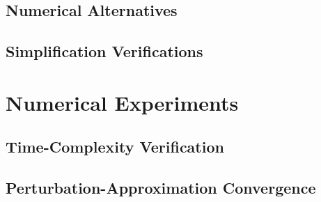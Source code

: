 \documentclass[
headings=optiontohead,              %
12pt,                               %
DIV=13,                             %
twoside=false,                      %
open=right,                         %
BCOR=00mm,                          %
toc=bibliographynumbered            %
]{scrreport}
\begin{document}
    \section{Numerical Alternatives}

    \section{Simplification Verifications}

\chapter{Numerical Experiments}
\label{sec:numerical-experiments}

\FloatBarrier

    \section{Time-Complexity Verification}

    \section{Perturbation-Approximation Convergence}

    \cite{variationalClassicalNetworksPaper}
    
\end{document}
